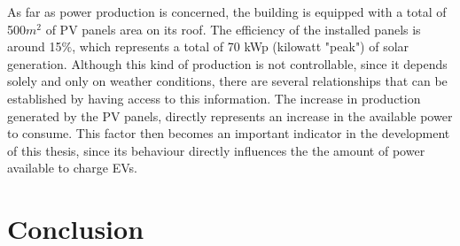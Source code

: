 As far as power production is concerned, the building is equipped with a total of 500$m^2$ of \ac{PV} panels area on its roof. The efficiency of the installed panels is around 15$\%$, which represents a total of 70 kWp (kilowatt "peak") of solar generation. Although this kind of production is not controllable, since it depends solely and only on weather conditions, there are several relationships that can be established by having access to this information. The increase in production generated by the \ac{PV} panels, directly represents an increase in the available power to consume. This factor then becomes an important indicator in the development of this thesis, since its behaviour directly influences the the amount of power available to charge \ac{EV}s.






\section{Conclusion}

